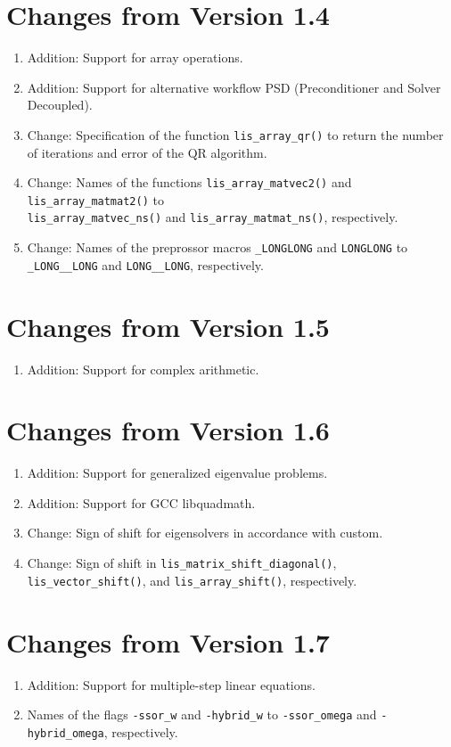 \documentclass[a4paper]{article}
\begin{document}
\section*{Changes from Version 1.4}
\begin{enumerate}
\item Addition: Support for array operations.
\item Addition: Support for alternative workflow PSD (Preconditioner and Solver
      Decoupled). 
\item Change: Specification of the function 
      {\tt lis\_array\_qr()} to return 
      the number of iterations and error of the QR algorithm. 
\item Change: Names of the functions
      {\tt lis\_array\_matvec2()} and {\tt lis\_array\_matmat2()} to \\
      {\tt lis\_array\_matvec\_ns()} and {\tt lis\_array\_matmat\_ns()}, respectively.
\item Change: Names of the preprossor macros {\tt \_LONGLONG} and 
      {\tt LONGLONG} to {\tt \_LONG\_\_LONG} and {\tt LONG\_\_LONG}, respectively.
\end{enumerate}

\section*{Changes from Version 1.5}
\begin{enumerate}
\item Addition: Support for complex arithmetic.
\end{enumerate}
  
\section*{Changes from Version 1.6}
\begin{enumerate}
\item Addition: Support for generalized eigenvalue problems.
\item Addition: Support for GCC libquadmath.
\item Change: Sign of shift for eigensolvers in accordance with custom.
\item Change: Sign of shift in {\tt lis\_matrix\_shift\_diagonal()}, 
{\tt lis\_vector\_shift()}, and {\tt lis\_array\_shift()}, respectively.
\end{enumerate}
  
\section*{Changes from Version 1.7}
\begin{enumerate}
\item Addition: Support for multiple-step linear equations.
\item Names of the flags {\tt -ssor\_w} and {\tt -hybrid\_w} to {\tt -ssor\_omega}
and {\tt -hybrid\_omega}, respectively.
\end{enumerate}
  
\end{document}
